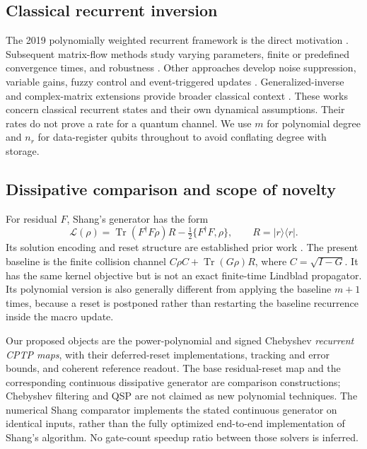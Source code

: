 \documentclass{ieeeaccess}
\newcommand{\ket}[1]{\lvert #1\rangle}\newcommand{\bra}[1]{\langle #1\rvert}
\newcommand{\Tr}{\operatorname{Tr}}\newcommand{\E}{\mathcal E}
\begin{document}
\subsection{Classical recurrent inversion}
The 2019 polynomially weighted recurrent framework is the direct motivation \cite{r4}. Subsequent matrix-flow methods study varying parameters, finite or predefined convergence times, and robustness \cite{r17,r18,r19,r20,r21,r22}. Other approaches develop noise suppression, variable gains, fuzzy control and event-triggered updates \cite{r23,r24,r25,r26,r27}. Generalized-inverse and complex-matrix extensions provide broader classical context \cite{r28,r29,r30,r31,r32,r33,r34}. These works concern classical recurrent states and their own dynamical assumptions. Their rates do not prove a rate for a quantum channel. We use $m$ for polynomial degree and $n_r$ for data-register qubits throughout to avoid conflating degree with storage.

\subsection{Dissipative comparison and scope of novelty}
For residual $F$, Shang's generator has the form
\begin{equation}\label{eq:generator}
\mathcal L(\rho)=\Tr(F^\dagger F\rho)R-\tfrac12\{F^\dagger F,\rho\},\qquad R=\ket r\bra r.
\end{equation}
Its solution encoding and reset structure are established prior work \cite{shang}. The present baseline is the finite collision channel $C\rho C+\Tr(G\rho)R$, where $C=\sqrt{I-G}$. It has the same kernel objective but is not an exact finite-time Lindblad propagator. Its polynomial version is also generally different from applying the baseline $m+1$ times, because a reset is postponed rather than restarting the baseline recurrence inside the macro update.

Our proposed objects are the power-polynomial and signed Chebyshev \emph{recurrent CPTP maps}, with their deferred-reset implementations, tracking and error bounds, and coherent reference readout. The base residual-reset map and the corresponding continuous dissipative generator are comparison constructions; Chebyshev filtering and QSP are not claimed as new polynomial techniques. The numerical Shang comparator implements the stated continuous generator on identical inputs, rather than the fully optimized end-to-end implementation of Shang's algorithm. No gate-count speedup ratio between those solvers is inferred.
\end{document}
